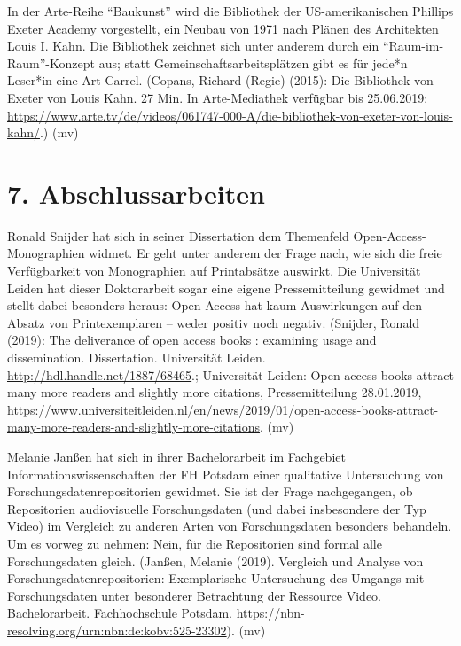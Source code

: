 \documentclass[a4paper,
fontsize=11pt,
oneside,
numbers=noperiodatend,
parskip=half-,
bibliography=totoc,
final
]{scrartcl}
\begin{document}
In der Arte-Reihe \enquote{Baukunst} wird die Bibliothek der
US-amerikanischen Phillips Exeter Academy vorgestellt, ein Neubau von
1971 nach Plänen des Architekten Louis I. Kahn. Die Bibliothek zeichnet
sich unter anderem durch ein \enquote{Raum-im-Raum}-Konzept aus; statt
Gemeinschaftsarbeitsplätzen gibt es für jede*n Leser*in eine Art Carrel.
(Copans, Richard (Regie) (2015): Die Bibliothek von Exeter von Louis
Kahn. 27 Min. In Arte-Mediathek verfügbar bis 25.06.2019:
\url{https://www.arte.tv/de/videos/061747-000-A/die-bibliothek-von-exeter-von-louis-kahn/}.)
(mv)

\hypertarget{abschlussarbeiten}{%
\section*{7. Abschlussarbeiten}\label{abschlussarbeiten}}

Ronald Snijder hat sich in seiner Dissertation dem Themenfeld
Open-Access-Monographien widmet. Er geht unter anderem der Frage nach,
wie sich die freie Verfügbarkeit von Monographien auf Printabsätze
auswirkt. Die Universität Leiden hat dieser Doktorarbeit sogar eine
eigene Pressemitteilung gewidmet und stellt dabei besonders heraus: Open
Access hat kaum Auswirkungen auf den Absatz von Printexemplaren -- weder
positiv noch negativ. (Snijder, Ronald (2019): The deliverance of open
access books : examining usage and dissemination. Dissertation.
Universität Leiden. \url{http://hdl.handle.net/1887/68465}.; Universität
Leiden: Open access books attract many more readers and slightly more
citations, Pressemitteilung 28.01.2019,
\url{https://www.universiteitleiden.nl/en/news/2019/01/open-access-books-attract-many-more-readers-and-slightly-more-citations}.
(mv)

Melanie Janßen hat sich in ihrer Bachelorarbeit im Fachgebiet
Informationswissenschaften der FH Potsdam einer qualitative Untersuchung
von Forschungsdatenrepositorien gewidmet. Sie ist der Frage
nachgegangen, ob Repositorien audiovisuelle Forschungsdaten (und dabei
insbesondere der Typ Video) im Vergleich zu anderen Arten von
Forschungsdaten besonders behandeln. Um es vorweg zu nehmen: Nein, für
die Repositorien sind formal alle Forschungsdaten gleich. (Janßen,
Melanie (2019). Vergleich und Analyse von Forschungsdatenrepositorien:
Exemplarische Untersuchung des Umgangs mit Forschungsdaten unter
besonderer Betrachtung der Ressource Video. Bachelorarbeit.
Fachhochschule Potsdam.
\url{https://nbn-resolving.org/urn:nbn:de:kobv:525-23302}). (mv)
\end{document}
